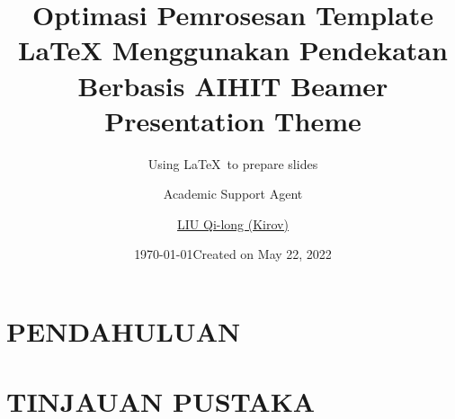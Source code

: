 \documentclass{sintefbeamer}
\title{Optimasi Pemrosesan Template LaTeX Menggunakan Pendekatan Berbasis AI}
\author{Academic Support Agent}
\date{\today}
\begin{document}
\maketitle

\begin{abstract}

\end{abstract}

\chapter{PENDAHULUAN}


\chapter{TINJAUAN PUSTAKA}



\title{HIT Beamer\\ Presentation Theme}
\subtitle{Using \LaTeX\ to prepare slides}
\author{\href{mailto:qilong-kirov.liu@connect.hit.cn}{LIU Qi-long (Kirov)}}
\date{Created on May 22, 2022}
\end{document}
